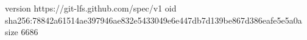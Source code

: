 version https://git-lfs.github.com/spec/v1
oid sha256:78842a61514ae397946ae832e5433049e6e447db7d139be867d386eafe5e5a0a
size 6686
